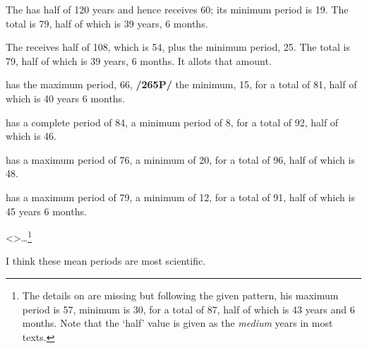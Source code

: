The \Sun\xspace has half of 120 years and hence receives 60; its minimum period is 19. The total is 79, half of which is 39 years, 6 months.

The \Moon\xspace receives half of 108, which is 54, plus the minimum period, 25. The total is 79, half of which is 39 years, 6 months. It allots that amount. 

\Mars\xspace has the maximum period, 66, \textbf{/265P/} the minimum, 15, for a total of 81, half of which is 40 years 6 months.

\Venus\xspace has a complete period of 84, a minimum period of 8, for a total of 92, half of which is 46.

\Mercury\xspace has a maximum period of 76, a minimum of 20, for a total of 96, half of which is 48.

\Jupiter\xspace has a maximum period of 79, a minimum of 12, for a total of 91, half of which is 45 years 6 months.

<\Saturn>…\footnote{The details on \Saturn\xspace are missing but following the given pattern, his maximum period is 57, minimum is 30, for a total of 87, half of which is 43 years and 6 months. Note that the `half' value is given as the \textit{medium} years in most texts.}

I think these mean periods are most scientific.

\newpage